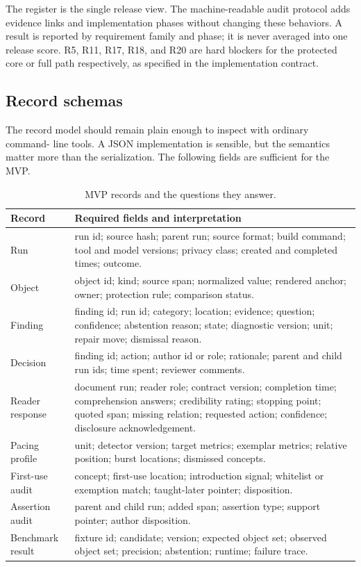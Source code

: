 The register is the single release view. The machine-readable audit protocol
adds evidence links and implementation phases without changing these
behaviors. A result is reported by requirement family and phase; it is never
averaged into one release score. R5, R11, R17, R18, and R20 are hard blockers
for the protected core or full path respectively, as specified in the
implementation contract.

\subsection{Record schemas}

The record model should remain plain enough to inspect with ordinary command-
line tools. A JSON implementation is sensible, but the semantics matter more
than the serialization. The following fields are sufficient for the MVP.

\begin{table}[H]
\centering
\small
\begin{tabularx}{\textwidth}{@{}p{}L@{}}
\toprule
Record & Required fields and interpretation \\
\midrule
Run & run id; source hash; parent run; source format; build command; tool and
model versions; privacy class; created and completed times; outcome. \\
Object & object id; kind; source span; normalized value; rendered anchor;
owner; protection rule; comparison status. \\
Finding & finding id; run id; category; location; evidence; question;
confidence; abstention reason; state; diagnostic version; unit; repair move;
dismissal reason. \\
Decision & finding id; action; author id or role; rationale; parent and child
run ids; time spent; reviewer comments. \\
Reader response & document run; reader role; contract version; completion
time; comprehension answers; credibility rating; stopping point; quoted span;
missing relation; requested action; confidence; disclosure acknowledgement. \\
Pacing profile & unit; detector version; target metrics; exemplar metrics;
relative position; burst locations; dismissed concepts. \\
First-use audit & concept; first-use location; introduction signal; whitelist
or exemption match; taught-later pointer; disposition. \\
Assertion audit & parent and child run; added span; assertion type; support
pointer; author disposition. \\
Benchmark result & fixture id; candidate; version; expected object set;
observed object set; precision; abstention; runtime; failure trace. \\
\bottomrule
\end{tabularx}
\caption{MVP records and the questions they answer.}
\label{tab:record-schemas}
\end{table}

